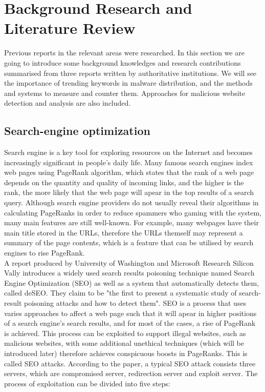 \documentclass[pdftex,a4paper,12pt]{article}
\begin{document}
\section*{Background Research and Literature Review}
Previous reports in the relevant areas were researched. In this section we are going to introduce some background knowledges and research contributions summarised from three reports written by authoritative institutions. We will see the importance of trending keywords in malware distribution, and the methods and systems to measure and counter them. Approaches for malicious website detection and analysis are also included. 

\subsection*{Search-engine optimization}
Search engine is a key tool for exploring resources on the Internet and becomes increasingly significant in people's daily life. Many famous search engines index web pages using PageRank algorithm, which states that the rank of a web page depends on the quantity and quality of incoming links, and the higher is the rank, the more likely that the web page will apear in the top results of a search query. Although search engine providers do not usually reveal their algorithms in calculating PageRanks in order to reduce spammers who gaming with the system, many main features are still well-known. For example, many webpages have their main title stored in the URLs, therefore the URLs themself may represent a summary of the page contents, which is a feature that can be utilised by search engines to rise PageRank. \\
A report produced by University of Washington and Microsoft Research Silicon Vally introduces a widely used search results poisoning technique named Search Engine Optimization (SEO) as well as a system that automatically detects them, called deSEO.\cite{deseo} They claim to be "the first to present a systematic study of search-result poisoning attacks and how to detect them". SEO is a process that uses varies approaches to affect a web page such that it will apear in higher positions of a search engine's search results, and for most of the cases, a rise of PageRank is achieved. This process can be exploited to support illegal websites, such as malicious websites, with some additional unethical techniques (which will be introduced later) therefore achieves conspicuous boosts in PageRanks. This is called SEO attacks. According to the paper, a typical SEO attack consists three servers, which are compromised server, redirection server and exploit server. The process of exploitation can be divided into five steps: 
\end{document}
